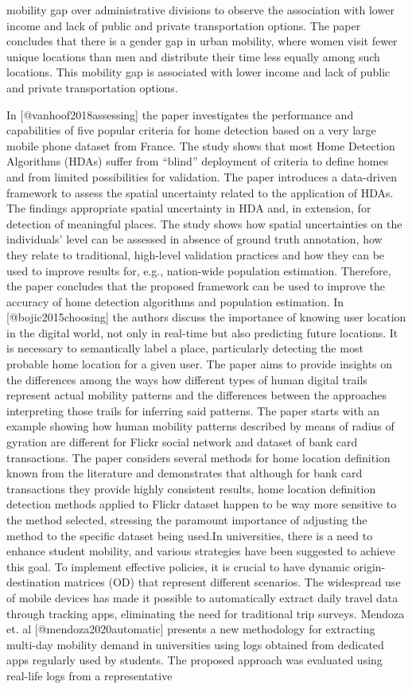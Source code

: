 \documentclass[runningheads]{llncs}
\begin{document}
mobility gap over administrative divisions to observe the association with lower income and lack of public and private transportation options. The paper concludes that there is a gender gap in urban mobility, where women visit fewer unique locations than men and distribute their time less equally among such locations. This mobility gap is associated with lower income and lack of public and private transportation options.

In {[}@vanhoof2018assessing{]} the paper investigates the performance and capabilities of five popular criteria for home detection based on a very large mobile phone dataset from France. The study shows that most Home Detection Algorithms (HDAs) suffer from ``blind'' deployment of criteria to define homes and from limited possibilities for validation. The paper introduces a data-driven framework to assess the spatial uncertainty related to the application of HDAs. The findings appropriate spatial uncertainty in HDA and, in extension, for detection of meaningful places. The study shows how spatial uncertainties on the individuals' level can be assessed in absence of ground truth annotation, how they relate to traditional, high-level validation practices and how they can be used to improve results for, e.g., nation-wide population estimation. Therefore, the paper concludes that the proposed framework can be used to improve the accuracy of home detection algorithms and population estimation. In {[}@bojic2015choosing{]} the authors discuss the importance of knowing user location in the digital world, not only in real-time but also predicting future locations. It is necessary to semantically label a place, particularly detecting the most probable home location for a given user. The paper aims to provide insights on the differences among the ways how different types of human digital trails represent actual mobility patterns and the differences between the approaches interpreting those trails for inferring said patterns. The paper starts with an example showing how human mobility patterns described by means of radius of gyration are different for Flickr social network and dataset of bank card transactions. The paper considers several methods for home location definition known from the literature and demonstrates that although for bank card transactions they provide highly consistent results, home location definition detection methods applied to Flickr dataset happen to be way more sensitive to the method selected, stressing the paramount importance of adjusting the method to the specific dataset being used.In universities, there is a need to enhance student mobility, and various strategies have been suggested to achieve this goal. To implement effective policies, it is crucial to have dynamic origin-destination matrices (OD) that represent different scenarios. The widespread use of mobile devices has made it possible to automatically extract daily travel data through tracking apps, eliminating the need for traditional trip surveys. Mendoza et. al {[}@mendoza2020automatic{]} presents a new methodology for extracting multi-day mobility demand in universities using logs obtained from dedicated apps regularly used by students. The proposed approach was evaluated using real-life logs from a representative 
\end{document}

